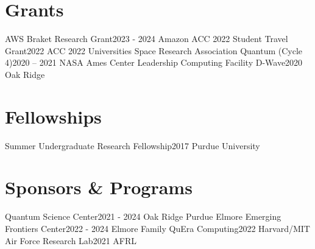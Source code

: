 \section{Grants}
  \resumeSubHeadingListStart
    \resumeSubheading
      {AWS Braket Research Grant}{2023 - 2024}
      {Amazon}{}
    \resumeSubheading
      {ACC 2022 Student Travel Grant}{2022}
      {ACC 2022}{}
    \resumeSubheading
      {Universities Space Research Association Quantum (Cycle 4)}{2020 – 2021}
      {NASA Ames Center}{}
    \resumeSubheading
      {Leadership Computing Facility D-Wave}{2020}
      {Oak Ridge}{}
  \resumeSubHeadingListEnd
\section{Fellowships}
  \resumeSubHeadingListStart
    \resumeSubheading
      {Summer Undergraduate Research Fellowship}{2017}
      {Purdue University}{}
  \resumeSubHeadingListEnd
\section{Sponsors \& Programs}
  \resumeSubHeadingListStart
    \resumeSubheading
      {Quantum Science Center}{2021 - 2024}
      {Oak Ridge}{}
    \resumeSubheading
      {Purdue Elmore Emerging Frontiers Center}{2022 - 2024}
      {Elmore Family}{}
    \resumeSubheading
      {QuEra Computing}{2022}
      {Harvard/MIT}{}
    \resumeSubheading
      {Air Force Research Lab}{2021}
      {AFRL}{}
  \resumeSubHeadingListEnd
